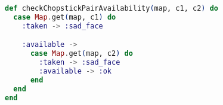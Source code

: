 \begin{lstlisting}[language=Elixir, title=Check if a chopstick pair is available for request]
def checkChopstickPairAvailability(map, c1, c2) do
  case Map.get(map, c1) do
    :taken -> :sad_face

    :available ->
      case Map.get(map, c2) do
        :taken -> :sad_face
        :available -> :ok
      end
  end
end
\end{lstlisting}
